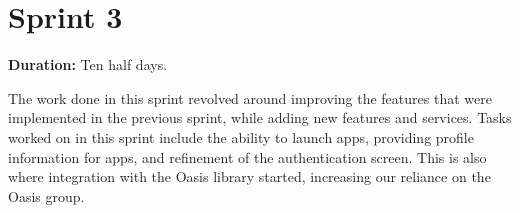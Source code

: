 \section{Sprint 3}%

\textbf{Duration:} Ten half days. \newline

The work done in this sprint revolved around improving the features that were implemented in the previous sprint, while adding new features and services. 
Tasks worked on in this sprint include the ability to launch apps, providing profile information for apps, and refinement of the authentication screen. 
This is also where integration with the Oasis library started, increasing our reliance on the Oasis group. 